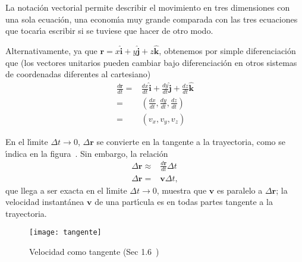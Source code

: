 La notaci\'on vectorial permite describir el movimiento en tres dimensiones con una sola ecuaci\'on, una econom\'\i a muy grande comparada con las tres ecuaciones que tocar\'\i a escribir si se tuviese que hacer de otro modo. 

Alternativamente, ya que $\mathbf{r}=x\hat{\mathbf{i}}+
y\hat{\mathbf{j}}+z\hat{\mathbf{k}}$, obtenemos por simple
diferenciaci\'on que (los vectores unitarios pueden cambiar bajo
diferenciaci\'on en otros sistemas de coordenadas diferentes al
cartesiano)
\begin{align}
 \frac{d\mathbf{r}}{dt}=&\frac{dx}{dt}\hat{\mathbf{i}}   
+\frac{dy}{dt}\hat{\mathbf{j}}   +\frac{dz}{dt}\hat{\mathbf{k}}\nonumber\\
=&
\left(
\frac{dx}{dt},\frac{dy}{dt},\frac{dz}{dt}
\right)\nonumber\\
=&(v_x,v_y,v_z)
\end{align}




En el l\'\i mite $\Delta t\to0$, $\Delta\mathbf{r}$ se convierte en la tangente a la trayectoria, como se \'\i ndica en la figura~\cite{fig:tangente}. Sin embargo, la relaci\'on
\begin{align}
  \Delta\mathbf{r}\approx&\frac{d\mathbf{r}}{dt}\Delta t\nonumber\\
  \Delta\mathbf{r}=&\mathbf{v}\Delta t,
\end{align}
que llega a ser exacta en el l\'\i mite $\Delta t\to 0$, muestra que $\mathbf{v}$ es paralelo a $\Delta\mathbf{r}$; la velocidad instant\'anea $\mathbf{v}$ de una part\'\i cula es en todas partes tangente a la trayectoria. 
\begin{figure}
  \centering
  \texttt{[image: tangente]}
  \caption{Velocidad como tangente (Sec 1.6~\cite{Kleppner})}
  \label{fig:tangente}
\end{figure}

